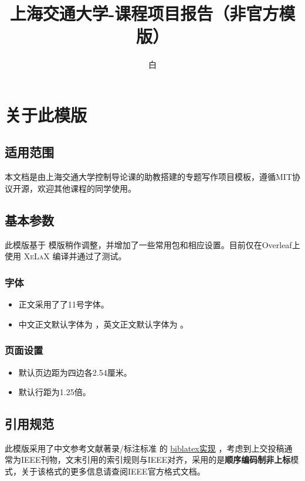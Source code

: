 \documentclass[a4paper,11pt,AutoFakeBold]{ctexart}
\title{\textbf{上海交通大学-课程项目报告（非官方模版）}}
\author{白\fallback{鹡鸰}}
\date{}
\begin{document}
\maketitle

\section{关于此模版}

\subsection{适用范围}

本文档是由上海交通大学控制导论课的助教搭建的专题写作项目模板，遵循MIT协议开源，欢迎其他课程的同学使用。

\subsection{基本参数}

此模版基于  模版稍作调整，并增加了一些常用包和相应设置。目前仅在Overleaf上使用 \textsc{XeLaX} 编译并通过了测试。

\subsubsection{字体}

\begin{itemize}
    \item 正文采用了了11号字体。
    \item 中文正文默认字体为 ，英文正文默认字体为 。
\end{itemize}

\subsubsection{页面设置}

\begin{itemize}
    \item 默认页边距为四边各2.54厘米。
    \item 默认行距为1.25倍。
    
\end{itemize}

\subsection{引用规范}

此模版采用了中文参考文献著录/标注标准  的 \href{https://github.com/hushidong/biblatex-gb7714-2015?tab=readme-ov-file#jumptotutorial}{biblatex实现} \parencite{gb7714}，考虑到上交投稿通常为IEEE刊物，文末引用的索引规则与IEEE对齐，采用的是\textbf{顺序编码制非上标}模式，关于该格式的更多信息请查阅IEEE官方格式文档。
\end{document}
